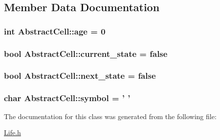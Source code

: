 \subsection{Member Data Documentation}
\hypertarget{classAbstractCell_a99e95bd6e878d85cb33a9fe90c4b7d25}{
\subsubsection[{age}]{\setlength{\rightskip}{0pt plus 5cm}int Abstract\-Cell\-::age = 0\hspace{0.3cm}{\ttfamily [protected]}}}\label{classAbstractCell_a99e95bd6e878d85cb33a9fe90c4b7d25}
\hypertarget{classAbstractCell_a738a87fd7a98a0bbeb723d0690b07e97}{
\subsubsection[{current\-\_\-state}]{\setlength{\rightskip}{0pt plus 5cm}bool Abstract\-Cell\-::current\-\_\-state = false\hspace{0.3cm}{\ttfamily [protected]}}}\label{classAbstractCell_a738a87fd7a98a0bbeb723d0690b07e97}
\hypertarget{classAbstractCell_a196b0194fb5cd8701b0aae28d12a0586}{
\subsubsection[{next\-\_\-state}]{\setlength{\rightskip}{0pt plus 5cm}bool Abstract\-Cell\-::next\-\_\-state = false\hspace{0.3cm}{\ttfamily [protected]}}}\label{classAbstractCell_a196b0194fb5cd8701b0aae28d12a0586}
\hypertarget{classAbstractCell_ad763295e814970b07d31d98b560a4b19}{
\subsubsection[{symbol}]{\setlength{\rightskip}{0pt plus 5cm}char Abstract\-Cell\-::symbol = ' '\hspace{0.3cm}{\ttfamily [protected]}}}\label{classAbstractCell_ad763295e814970b07d31d98b560a4b19}


The documentation for this class was generated from the following file\-:\begin{DoxyCompactItemize}
\item 
\hyperlink{Life_8h}{Life.\-h}\end{DoxyCompactItemize}
